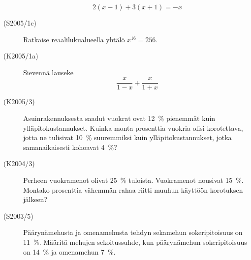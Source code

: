 \begin{description}
                        \[ 2(x - 1) + 3(x + 1 ) = -x \]
    \item[(S2005/1c)]  Ratkaise reaalilukualueella yhtälö $ x^{16} = 256 $.
    \item[(K2005/1a)]  Sievennä lauseke
                        \[ \frac{x}{1 - x} + \frac{x}{1 + x} \]
    \item[(K2005/3)]   Asuinrakennuksesta saadut vuokrat ovat 12~\% pienemmät kuin
                        ylläpitokustannukset. Kuinka monta prosenttia vuokria olisi
                        korotettava, jotta ne tulisivat 10~\% suuremmiksi kuin 
                        ylläpitokustannukset, jotka samanaikaisesti kohoavat 4~\%?
    \item[(K2004/3)]   Perheen vuokramenot olivat 25~\% tuloista. Vuokramenot nousivat
                        15~\%. Montako prosenttia vähemmän rahaa riitti muuhun
                        käyttöön korotuksen jälkeen?
    \item[(S2003/5)]   Päärynämehusta ja omenamehusta tehdyn sekamehun sokeripitoisuus
                        on 11~\%. Määritä mehujen sekoitussuhde, kun päärynämehun
                        sokeripitoisuus on 14~\% ja omenamehun 7~\%.


\end{description}
